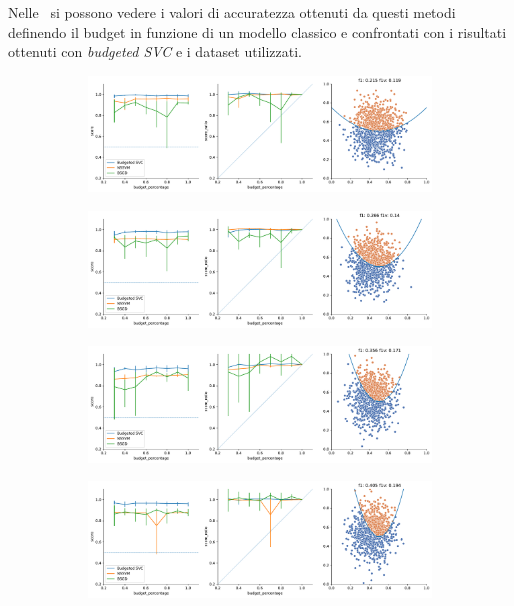 Nelle~ si possono vedere i valori di accuratezza ottenuti da questi metodi definendo il budget in funzione di un modello classico e confrontati con i risultati ottenuti con \emph{budgeted SVC} e i dataset utilizzati.
\begin{figure}
    \begin{subfigure}{.5\textwidth}
        \centering
        \includegraphics[width=\textwidth]{img/comp_old/1.pdf}
    \end{subfigure}%
    \begin{subfigure}{.5\textwidth}
        \centering
        \includegraphics[width=\textwidth]{img/comp_old/2.pdf}
    \end{subfigure}
    \hfill
    \begin{subfigure}{.5\textwidth}
        \centering
        \includegraphics[width=\textwidth]{img/comp_old/3.pdf}
    \end{subfigure}
    \begin{subfigure}{.5\textwidth}
        \centering
        \includegraphics[width=\textwidth]{img/comp_old/4.pdf}

\end{subfigure}
\end{figure}
